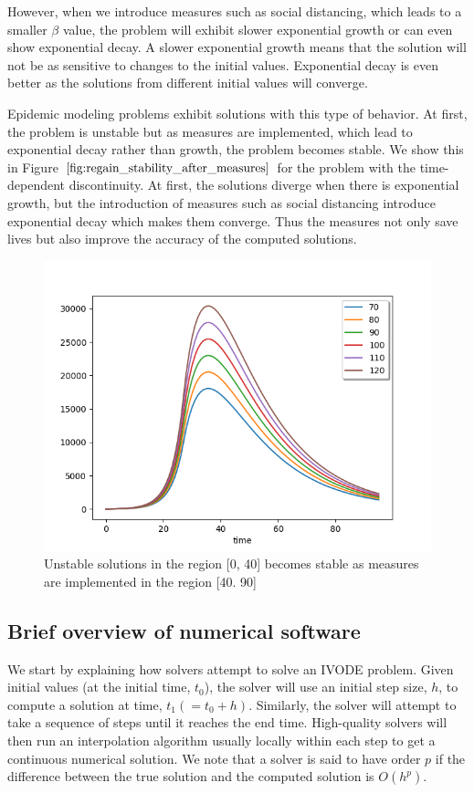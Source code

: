 However, when we introduce measures such as social distancing, which leads to a smaller $\beta$ value, the problem will exhibit slower exponential growth or can even show exponential decay. A slower exponential growth means that the solution will not be as sensitive to changes to the initial values. Exponential decay is even better as the solutions from different initial values will converge.

Epidemic modeling problems exhibit solutions with this type of behavior. At first, the problem is unstable but as measures are implemented, which lead to exponential decay rather than growth, the problem becomes stable. We show this in Figure $\ref{fig:regain_stability_after_measures}$ for the problem with the time-dependent discontinuity. At first, the solutions diverge when there is exponential growth, but the introduction of measures such as social distancing introduce exponential decay which makes them converge. Thus the measures not only save lives but also improve the accuracy of the computed solutions.

\begin{figure}[H]
\centering
\includegraphics[width=0.7\linewidth]{./figures/regain_stability_after_measures}
\caption{Unstable solutions in the region [0, 40] becomes stable as measures are implemented in the region [40. 90]}
\label{fig:regain_stability_after_measures}
\end{figure}

\subsection{Brief overview of numerical software}
We start by explaining how solvers attempt to solve an IVODE problem. Given initial values (at the initial time, $t_0$), the solver will use an initial step size, $h$, to compute a solution at time, $t_1 (= t_0 + h)$. Similarly, the solver will attempt to take a sequence of steps until it reaches the end time. High-quality solvers will then run an interpolation algorithm usually locally within each step to get a continuous numerical solution. We note that a solver is said to have order $p$ if the difference between the true solution and the computed solution is $O(h^p)$.

